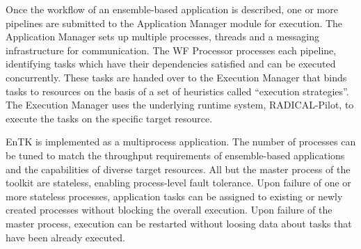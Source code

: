 

Once the workflow of an ensemble-based application is described, one or more
pipelines are submitted to the Application Manager module for execution. The
Application Manager sets up multiple processes, threads and a messaging
infrastructure for communication. The WF Processor processes each pipeline,
identifying tasks which have their dependencies satisfied and can be executed
concurrently. These tasks are handed over to the Execution Manager that binds
tasks to resources on the basis of a set of heuristics called ``execution
strategies''. The Execution Manager uses the underlying runtime system,
RADICAL-Pilot, to execute the tasks on the specific target resource.

EnTK is implemented as a multiprocess application. The number of processes
can be tuned to match the throughput requirements of ensemble-based
applications and the capabilities of diverse target resources. All but the
master process of the toolkit are stateless, enabling process-level fault
tolerance. Upon failure of one or more stateless processes, application tasks
can be assigned to existing or newly created processes without blocking the
overall execution. Upon failure of the master process, execution can be
restarted without loosing data about tasks that have been already executed.

